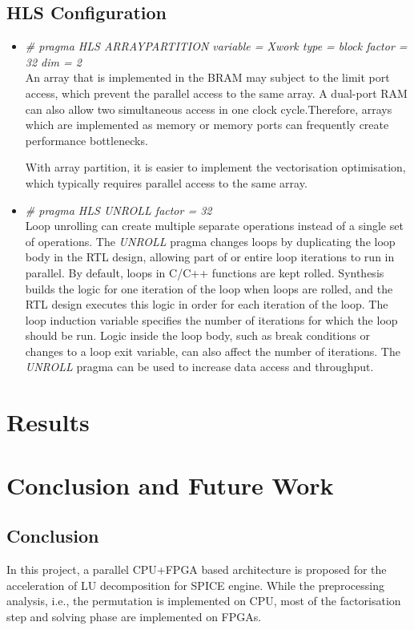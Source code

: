\documentclass[11pt,a4paper]{article}
\begin{document}
\subsection{HLS Configuration}
\begin{itemize}
    \item \textit{\# pragma HLS ARRAY\textunderscore PARTITION variable = Xwork type = block factor = 32 dim = 2}\\
    An array that is implemented in the BRAM may subject to the limit port access, which prevent the parallel access to the same array. A dual-port RAM can also allow two simultaneous access in one clock cycle.Therefore, arrays which are implemented as memory or memory ports can frequently create performance bottlenecks.

    With array partition, it is easier to implement the vectorisation optimisation, which typically requires parallel access to the same array.

    \item \textit{\# pragma HLS UNROLL factor = 32}\\
    Loop unrolling can create multiple separate operations instead of a single set of operations. The \emph{UNROLL} pragma changes loops by duplicating the loop body in the RTL design, allowing part of or entire loop iterations to run in parallel. By default, loops in C/C++ functions are kept rolled.  Synthesis builds the logic for one iteration of the loop when loops are rolled, and the RTL design executes this logic in order for each iteration of the loop. The loop induction variable specifies the number of iterations for which the loop should be run. Logic inside the loop body, such as break conditions or changes to a loop exit variable, can also affect the number of iterations. The \emph{UNROLL} pragma can be used to increase data access and throughput.
\end{itemize}

\section{Results}


\section{Conclusion and Future Work}
\subsection{Conclusion}
In this project, a parallel CPU+FPGA based architecture is proposed for the acceleration of LU decomposition for SPICE engine. While the preprocessing analysis, i.e., the permutation is implemented on CPU, most of the factorisation step and solving phase are implemented on FPGAs.
\end{document}
